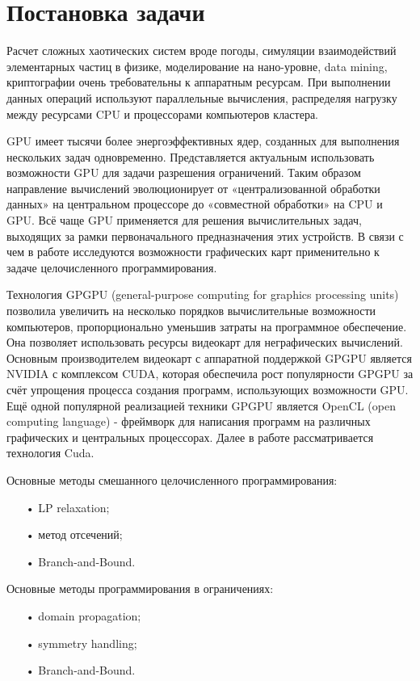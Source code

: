 \documentclass[a4paper,14pt,russian]{extreport}
\begin{document}
\section{Постановка задачи}

Расчет сложных хаотических систем вроде погоды, симуляции взаимодействий элементарных частиц в физике, моделирование на нано-уровне, data mining, криптографии очень требовательны к аппаратным ресурсам. При выполнении данных операций используют параллельные вычисления, распределяя нагрузку между ресурсами CPU и процессорами компьютеров кластера.
\par GPU имеет тысячи более энергоэффективных ядер, созданных для выполнения нескольких задач одновременно. Представляется актуальным использовать возможности GPU для задачи разрешения ограничений. Таким образом направление вычислений эволюционирует от «централизованной обработки данных» на центральном процессоре до «совместной обработки» на CPU и GPU. Всё чаще GPU применяется для решения вычислительных задач, выходящих за рамки первоначального предназначения этих устройств. В связи с чем в работе исследуются возможности графических карт применительно к задаче целочисленного программирования. 
\par Технология GPGPU (general-purpose computing for graphics processing units) позволила увеличить на несколько порядков вычислительные возможности компьютеров, пропорционально уменьшив затраты на программное обеспечение. Она позволяет использовать ресурсы видеокарт для неграфических вычислений. Основным производителем видеокарт с аппаратной поддержкой GPGPU является NVIDIA с комплексом CUDA, которая обеспечила рост популярности GPGPU за счёт упрощения процесса создания программ, использующих возможности GPU. Ещё одной популярной реализацией техники GPGPU является OpenCL (open computing language) - фреймворк для написания программ на различных графических и центральных процессорах. Далее в работе рассматривается технология Cuda.
\par Основные методы смешанного целочисленного программирования:
  \begin{itemize}
  \item[•] LP relaxation;
  \item[•] метод отсечений;
  \item[•] Branch-and-Bound.
  \end{itemize}
\par Основные методы программирования в ограничениях:
  \begin{itemize}
  \item[•] domain propagation;
  \item[•] symmetry handling;
  \item[•] Branch-and-Bound.
  \end{itemize}
\end{document}
